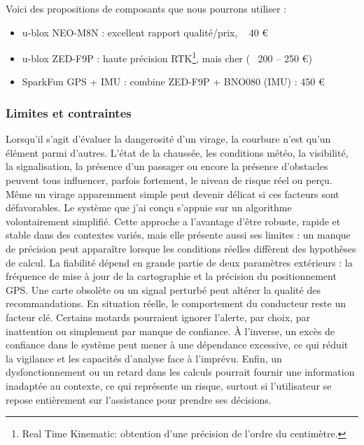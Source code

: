Voici des propositions de composants que nous pourrons utiliser : 
\begin{itemize}
  \item u-blox NEO-M8N : excellent rapport qualité/prix, ~ 40 €
  \item u-blox ZED-F9P : haute précision RTK\footnote{Real Time Kinematic: obtention d'une précision de l’ordre du centimètre.}, mais cher (~ 200 – 250 €)
  \item SparkFun GPS + IMU : combine ZED-F9P + BNO080 (IMU) : 450 €
\end{itemize}
\vspace{0.5cm}



\subsubsection{Limites et contraintes}
Lorsqu’il s’agit d’évaluer la dangerosité d’un virage, la courbure n’est qu’un élément parmi d’autres. L’état de la chaussée, les conditions météo, la visibilité, la signalisation, la présence d'un passager ou encore la présence d’obstacles peuvent tous influencer, parfois fortement, le niveau de risque réel ou perçu. Même un virage apparemment simple peut devenir délicat si ces facteurs sont défavorables.
Le système que j’ai conçu s’appuie sur un algorithme volontairement simplifié. Cette approche a l’avantage d’être robuste, rapide et stable dans des contextes variés, mais elle présente aussi ses limites : un manque de précision peut apparaître lorsque les conditions réelles diffèrent des hypothèses de calcul. La fiabilité dépend en grande partie de deux paramètres extérieurs : la fréquence de mise à jour de la cartographie et la précision du positionnement GPS. Une carte obsolète ou un signal perturbé peut altérer la qualité des recommandations.
En situation réelle, le comportement du conducteur reste un facteur clé. Certains motards pourraient ignorer l’alerte, par choix, par inattention ou simplement par manque de confiance. À l’inverse, un excès de confiance dans le système peut mener à une dépendance excessive, ce qui réduit la vigilance et les capacités d’analyse face à l’imprévu.
Enfin, un dysfonctionnement ou un retard dans les calculs pourrait fournir une information inadaptée au contexte, ce qui représente un risque, surtout si l’utilisateur se repose entièrement sur l’assistance pour prendre ses décisions.
\vspace{0.5cm}

